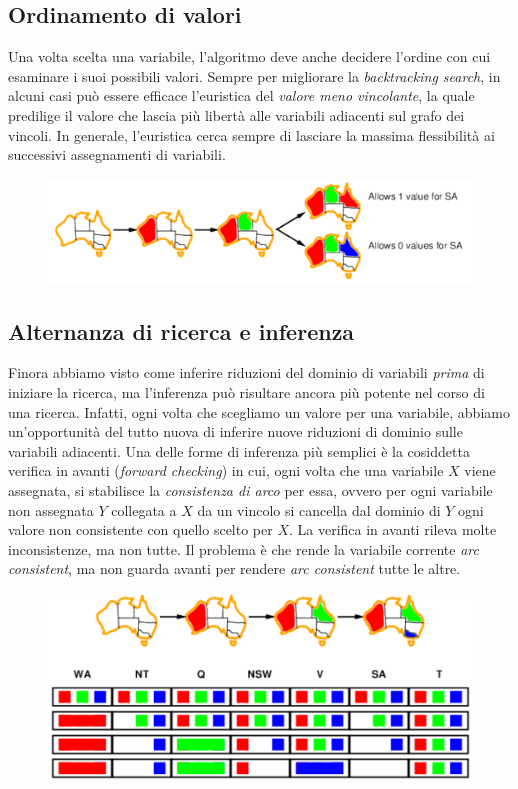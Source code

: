 \documentclass[11pt,oneside]{book}
\begin{document}
\subsection{Ordinamento di valori}
Una volta scelta una variabile, l'algoritmo deve anche decidere l'ordine con cui esaminare i suoi possibili valori. Sempre per migliorare la \textit{backtracking search}, in alcuni casi può essere efficace l'euristica del \textit{valore meno vincolante}, la quale predilige il valore che lascia più libertà alle variabili adiacenti sul grafo dei vincoli. In generale, l'euristica cerca sempre di lasciare la massima flessibilità ai successivi assegnamenti di variabili.
\begin{figure}[htp]
	\centering
	\includegraphics[width=\textwidth, height=\textheight, keepaspectratio]{lcv.png}
\end{figure}

\subsection{Alternanza di ricerca e inferenza}
Finora abbiamo visto come inferire riduzioni del dominio di variabili \textit{prima} di iniziare la ricerca, ma l'inferenza può risultare ancora più potente nel corso di una ricerca. Infatti, ogni volta che scegliamo un valore per una variabile, abbiamo un'opportunità del tutto nuova di inferire nuove riduzioni di dominio sulle variabili adiacenti. Una delle forme di inferenza più semplici è la cosiddetta verifica in avanti (\textit{forward checking}) in cui, ogni volta che una variabile $X$ viene assegnata, si stabilisce la \textit{consistenza di arco} per essa, ovvero per ogni variabile non assegnata $Y$ collegata a $X$ da un vincolo si cancella dal dominio di $Y$ ogni valore non consistente con quello scelto per $X$. La verifica in avanti rileva molte inconsistenze, ma non tutte. Il problema è che rende la variabile corrente \textit{arc consistent}, ma non guarda avanti per rendere \textit{arc consistent} tutte le altre.
\begin{figure}[htp]
	\centering
	\includegraphics[width=\textwidth, height=\textheight, keepaspectratio]{forward-checking.png}
\end{figure}
\end{document}
